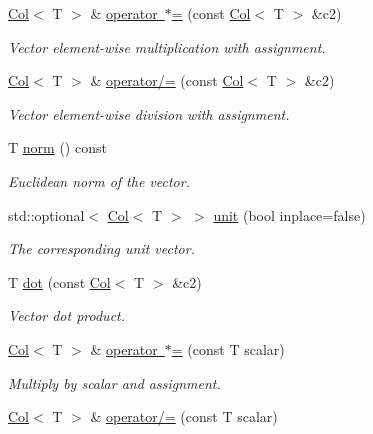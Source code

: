 \begin{DoxyCompactItemize}
\mbox{\hyperlink{classtao_1_1_col}{Col}}$<$ T $>$ \& \mbox{\hyperlink{classtao_1_1_col_a9274e5a0efd840c97741d05dca7bd5a2}{operator $\ast$=}} (const \mbox{\hyperlink{classtao_1_1_col}{Col}}$<$ T $>$ \&c2)
\begin{DoxyCompactList}\small\item\em Vector element-\/wise multiplication with assignment. \end{DoxyCompactList}\item 
\mbox{\hyperlink{classtao_1_1_col}{Col}}$<$ T $>$ \& \mbox{\hyperlink{classtao_1_1_col_ab51f1d091fdb1b5a6a4199f4253ecfaa}{operator/=}} (const \mbox{\hyperlink{classtao_1_1_col}{Col}}$<$ T $>$ \&c2)
\begin{DoxyCompactList}\small\item\em Vector element-\/wise division with assignment. \end{DoxyCompactList}\item 
T \mbox{\hyperlink{classtao_1_1_col_a229cd5a26d1fa4424150329127ca31d5}{norm}} () const
\begin{DoxyCompactList}\small\item\em Euclidean norm of the vector. \end{DoxyCompactList}\item 
std\+::optional$<$ \mbox{\hyperlink{classtao_1_1_col}{Col}}$<$ T $>$ $>$ \mbox{\hyperlink{classtao_1_1_col_ae913e98d4ed12cc7ee1975b2aff07c05}{unit}} (bool inplace=false)
\begin{DoxyCompactList}\small\item\em The corresponding unit vector. \end{DoxyCompactList}\item 
T \mbox{\hyperlink{classtao_1_1_col_a605b320d536f27395162eff375af8514}{dot}} (const \mbox{\hyperlink{classtao_1_1_col}{Col}}$<$ T $>$ \&c2)
\begin{DoxyCompactList}\small\item\em Vector dot product. \end{DoxyCompactList}\item 
\mbox{\hyperlink{classtao_1_1_col}{Col}}$<$ T $>$ \& \mbox{\hyperlink{classtao_1_1_col_a29c998087d6d7b98ecee1ba9fb7237a9}{operator $\ast$=}} (const T scalar)
\begin{DoxyCompactList}\small\item\em Multiply by scalar and assignment. \end{DoxyCompactList}\item 
\mbox{\hyperlink{classtao_1_1_col}{Col}}$<$ T $>$ \& \mbox{\hyperlink{classtao_1_1_col_abddd1e9737a0cafd50a52fd5063e4851}{operator/=}} (const T scalar)

\end{DoxyCompactItemize}
